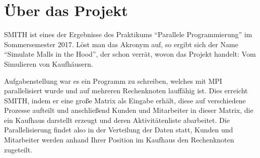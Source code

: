 \section{Über das Projekt}
SMITH ist eines der Ergebnisse des Praktikums \enquote{Parallele Programmierung} im Sommersemester 2017. Löst man das Akronym auf, so ergibt sich der Name \enquote{Simulate Malls in the Hood}, der schon verrät, wovon das Projekt handelt: Vom Simulieren von Kaufhäusern.

Aufgabenstellung war es ein Programm zu schreiben, welches mit MPI parallelisiert wurde und auf mehreren Rechenknoten lauffähig ist.
Dies erreicht SMITH, indem er eine große Matrix als Eingabe erhält, diese auf verschiedene Prozesse aufteilt und anschließend Kunden und Mitarbeiter in dieser Matrix, die ein Kaufhaus darstellt erzeugt und deren Aktivitätenliste abarbeitet. Die Parallelisierung findet also in der Verteilung der Daten statt, Kunden und Mitarbeiter werden anhand Ihrer Position im Kaufhaus den Rechenknoten zugeteilt.